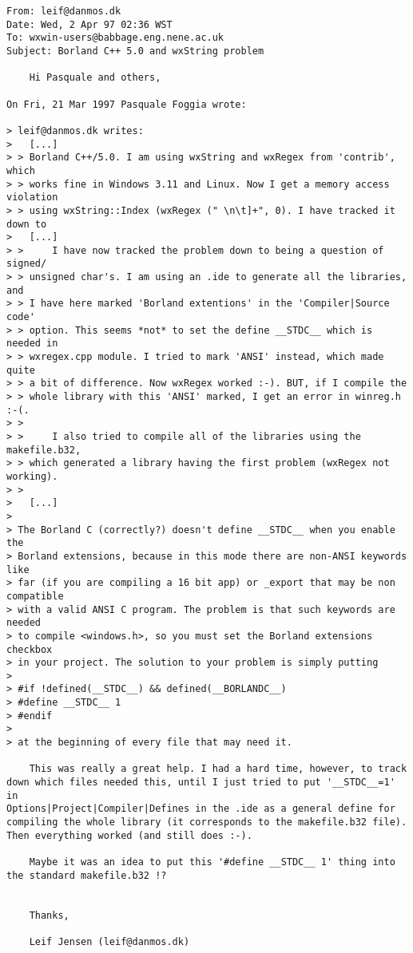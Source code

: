 {\small
\begin{verbatim}
From: leif@danmos.dk
Date: Wed, 2 Apr 97 02:36 WST
To: wxwin-users@babbage.eng.nene.ac.uk
Subject: Borland C++ 5.0 and wxString problem

    Hi Pasquale and others,

On Fri, 21 Mar 1997 Pasquale Foggia wrote:

> leif@danmos.dk writes:
> 	[...]
> > Borland C++/5.0. I am using wxString and wxRegex from 'contrib', which
> > works fine in Windows 3.11 and Linux. Now I get a memory access violation
> > using wxString::Index (wxRegex (" \n\t]+", 0). I have tracked it down to
> 	[...]
> >     I have now tracked the problem down to being a question of signed/
> > unsigned char's. I am using an .ide to generate all the libraries, and
> > I have here marked 'Borland extentions' in the 'Compiler|Source code'
> > option. This seems *not* to set the define __STDC__ which is needed in
> > wxregex.cpp module. I tried to mark 'ANSI' instead, which made quite
> > a bit of difference. Now wxRegex worked :-). BUT, if I compile the
> > whole library with this 'ANSI' marked, I get an error in winreg.h :-(.
> > 
> >     I also tried to compile all of the libraries using the makefile.b32,
> > which generated a library having the first problem (wxRegex not working).
> > 
> 	[...]
> 
> The Borland C (correctly?) doesn't define __STDC__ when you enable the
> Borland extensions, because in this mode there are non-ANSI keywords like
> far (if you are compiling a 16 bit app) or _export that may be non compatible
> with a valid ANSI C program. The problem is that such keywords are needed
> to compile <windows.h>, so you must set the Borland extensions checkbox
> in your project. The solution to your problem is simply putting 
> 
> #if !defined(__STDC__) && defined(__BORLANDC__)
> #define __STDC__ 1
> #endif
> 
> at the beginning of every file that may need it.

    This was really a great help. I had a hard time, however, to track
down which files needed this, until I just tried to put '__STDC__=1' in
Options|Project|Compiler|Defines in the .ide as a general define for
compiling the whole library (it corresponds to the makefile.b32 file).
Then everything worked (and still does :-).

    Maybe it was an idea to put this '#define __STDC__ 1' thing into
the standard makefile.b32 !?


    Thanks,

    Leif Jensen (leif@danmos.dk)
\end{verbatim}
}

